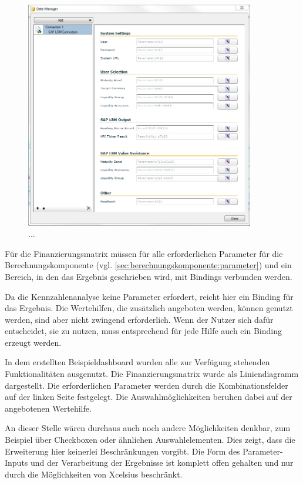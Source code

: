 \begin{onehalfspacing}
\begin{figure}[h]
\centering
\setlength{\unitlength}{1mm}
\includegraphics[width=10cm]{images/xcelsius_einstellungen.PNG}
\caption{...\label{fig:einstellung}}
\end{figure}  

Für die Finanzierungsmatrix müssen für alle erforderlichen Parameter für die Berechnungskomponente (vgl. \vref{sec:berechnungskomponente:parameter}) und ein Bereich, in den das Ergebnis geschrieben wird, mit Bindings verbunden werden.

Da die Kennzahlenanalyse keine Parameter erfordert, reicht hier ein Binding für das Ergebnis. Die Wertehilfen, die zusätzlich angeboten werden, können genutzt werden, sind aber nicht zwingend erforderlich. Wenn der Nutzer sich dafür entscheidet, sie zu nutzen, muss entsprechend für jede Hilfe auch ein Binding erzeugt werden.

In dem erstellten Beispieldashboard wurden alle zur Verfügung stehenden Funktionalitäten ausgenutzt. Die Finanzierungsmatrix wurde als Liniendiagramm dargestellt. Die erforderlichen Parameter werden durch die Kombinationsfelder auf der linken Seite festgelegt. Die Auswahlmöglichkeiten beruhen dabei auf der angebotenen Wertehilfe. 

An dieser Stelle wären durchaus auch noch andere Möglichkeiten denkbar, zum Beispiel über Checkboxen oder ähnlichen Auswahlelementen. Dies zeigt, dass die Erweiterung hier keinerlei Beschränkungen vorgibt. Die Form des Parameter-Inputs und der Verarbeitung der Ergebnisse ist komplett offen gehalten und nur durch die Möglichkeiten von Xcelsius beschränkt.


\end{onehalfspacing}

